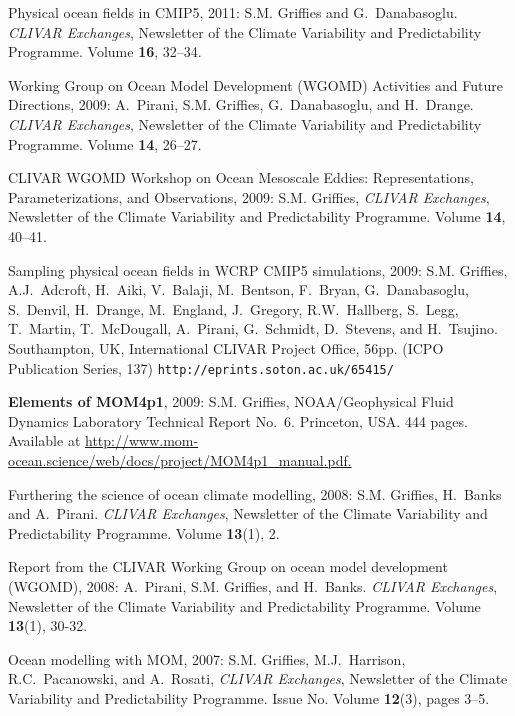 \begin{etaremune}
\item Physical ocean fields in CMIP5, 2011:  S.M. Grif\/f\/ies and G.\ Danabasoglu. {\em CLIVAR Exchanges}, Newsletter of the Climate Variability and Predictability Programme.  Volume {\bf 16}, 32--34.

\item Working Group on Ocean Model Development (WGOMD) Activities and Future Directions, 2009: A.\ Pirani, S.M. Grif\/f\/ies, G.\ Danabasoglu, and H.\ Drange.  {\em CLIVAR Exchanges}, Newsletter of the Climate Variability and Predictability Programme.  Volume {\bf 14}, 26--27.

\item CLIVAR WGOMD Workshop on Ocean Mesoscale Eddies:
  Representations, Parameterizations, and Observations, 2009: S.M. Grif\/f\/ies, {\em CLIVAR Exchanges}, Newsletter of the Climate Variability and Predictability Programme.  Volume {\bf 14}, 40--41.

\item Sampling physical ocean fields in WCRP CMIP5 simulations, 2009: S.M. Grif\/f\/ies, A.J.\ Adcroft, H.\ Aiki, V.\ Balaji, M.\ Bentson, F.\ Bryan, G.\ Danabasoglu, S.\ Denvil, H.\ Drange, M.\ England, J.\ Gregory, R.W.\ Hallberg, S.\ Legg, T.\ Martin, T.\ McDougall, A.\ Pirani, G.\ Schmidt, D.\ Stevens, and H.\ Tsujino. Southampton, UK, International CLIVAR Project Office, 56pp. (ICPO
  Publication Series, 137) {\tt http://eprints.soton.ac.uk/65415/}

\item {\bf Elements of MOM4p1}, 2009: S.M. Grif\/f\/ies,
  NOAA/Geophysical Fluid Dynamics Laboratory Technical Report No.\ 6. Princeton, USA.  444 pages.  Available at \href{http://www.mom-ocean.science/web/docs/project/MOM4p1_manual.pdf}{http://www.mom-ocean.science/web/docs/project/MOM4p1\_manual.pdf.}
  
\item Furthering the science of ocean climate modelling, 2008: S.M. Grif\/f\/ies, H.\ Banks and A.\ Pirani.  {\em CLIVAR Exchanges}, Newsletter of the Climate Variability and Predictability Programme.  Volume {\bf 13}(1), 2.

\item Report from the CLIVAR Working Group on ocean model development (WGOMD), 2008: A.\ Pirani, S.M. Grif\/f\/ies, and H.\ Banks. {\em CLIVAR Exchanges}, Newsletter of the Climate Variability and Predictability Programme.  Volume {\bf 13}(1), 30-32.

\item Ocean modelling with MOM, 2007: S.M. Grif\/f\/ies, M.J.\ Harrison, R.C.\ Pacanowski, and A.\ Rosati, {\em CLIVAR Exchanges}, Newsletter of the Climate Variability and Predictability Programme. Issue No. Volume {\bf 12}(3), pages 3--5.


\end{etaremune}

